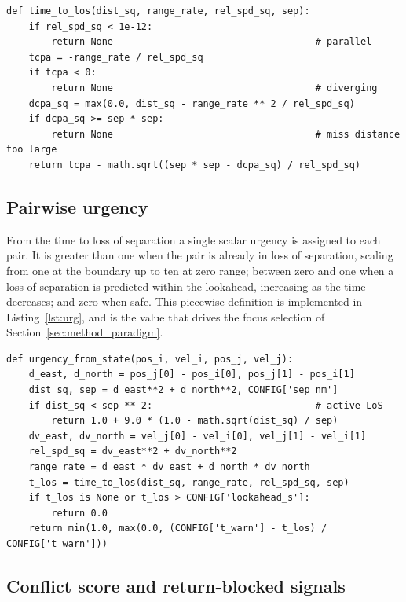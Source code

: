 \begin{lstlisting}[caption={Time to loss of separation (\texttt{conflict.py}).}, label={lst:tlos}]
def time_to_los(dist_sq, range_rate, rel_spd_sq, sep):
    if rel_spd_sq < 1e-12:
        return None                                    # parallel
    tcpa = -range_rate / rel_spd_sq
    if tcpa < 0:
        return None                                    # diverging
    dcpa_sq = max(0.0, dist_sq - range_rate ** 2 / rel_spd_sq)
    if dcpa_sq >= sep * sep:
        return None                                    # miss distance too large
    return tcpa - math.sqrt((sep * sep - dcpa_sq) / rel_spd_sq)
\end{lstlisting}

\subsection{Pairwise urgency}

From the time to loss of separation a single scalar urgency is assigned to each pair. It is greater than one when the pair is already in loss of separation, scaling from one at the boundary up to ten at zero range; between zero and one when a loss of separation is predicted within the lookahead, increasing as the time decreases; and zero when safe. This piecewise definition is implemented in Listing~\ref{lst:urg}, and is the value that drives the focus selection of Section~\ref{sec:method_paradigm}.

\begin{lstlisting}[caption={Pairwise urgency from planar state (\texttt{conflict.py}).}, label={lst:urg}]
def urgency_from_state(pos_i, vel_i, pos_j, vel_j):
    d_east, d_north = pos_j[0] - pos_i[0], pos_j[1] - pos_i[1]
    dist_sq, sep = d_east**2 + d_north**2, CONFIG['sep_nm']
    if dist_sq < sep ** 2:                             # active LoS
        return 1.0 + 9.0 * (1.0 - math.sqrt(dist_sq) / sep)
    dv_east, dv_north = vel_j[0] - vel_i[0], vel_j[1] - vel_i[1]
    rel_spd_sq = dv_east**2 + dv_north**2
    range_rate = d_east * dv_east + d_north * dv_north
    t_los = time_to_los(dist_sq, range_rate, rel_spd_sq, sep)
    if t_los is None or t_los > CONFIG['lookahead_s']:
        return 0.0
    return min(1.0, max(0.0, (CONFIG['t_warn'] - t_los) / CONFIG['t_warn']))
\end{lstlisting}

\subsection{Conflict score and return-blocked signals}

